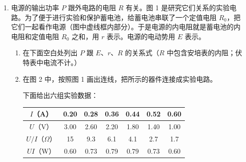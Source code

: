 \documentclass[\gkver]{gaokaozhenti}
\begin{document}
\begin{enumerate}
（A）用天平称量瓶装着水时瓶和水的总质量

（B）用天平称量空瓶的质量

（C）算出瓶内水的质量，求出瓶的容积

（D）调节天平横梁两端的螺旋，使天平平衡

（E）调节天平底板下面的螺旋，使天平的底板成为水平

把以上各项的英文字母代号按实验的合理顺序填写在下面横线上空白处。

（1），（2），（3），（4），（5）。



\item
电源的输出功率 $P$ 跟外电路的电阻 $R$ 有关。图 1 是研究它们关系的实验电路。为了便于进行实验和保护蓄电池，给蓄电池串联了一个定值电阻 $R_{0}$，把它们一起看作电源（图中虚线框内部分）。于是电源的内电阻就是蓄电池的内电阻和定值电阻 $R_{0}$ 之和，用 $r$ 表示。电源的电动势用 $E$ 表示。

\begin{enumerate}
	\item
	在下面空白处列出 $P$ 跟 $E$、$r$、$R$ 的关系式（$R$ 中包含安培表的内阻；伏特表中电流不计。）

	\item
	在图 2 中，按照图 1 画出连线，把所示的器件连接成实验电路。

	下面给出六组实验数据：

	\begin{center}
	\begin{tabular}{|c|c|c|c|c|c|c|}
	\hline
	$I$（A） & 0.20 & 0.28 & 0.36 & 0.44 & 0.52 & 0.60 \\
	\hline
	$U$（V） & 3.00 & 2.60 & 2.20 & 1.80 & 1.40 & 1.00 \\
	\hline
	$U/I$（$\Omega$） & 15 & 9.3 & 6.1 & 4.1 & 2.7 & 1.7 \\
	\hline
	$UI$（W） & 0.60 & 0.73 & 0.79 & 0.79 & 0.73 & 0.60 \\
	\hline
	\end{tabular}
	\end{center}


\end{enumerate}
\end{enumerate}
\end{document}
